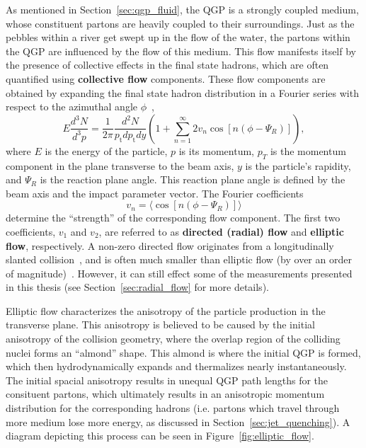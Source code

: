 As mentioned in Section~\ref{sec:qgp_fluid}, the QGP is a strongly coupled medium, whose constituent partons are heavily coupled to their surroundings. Just as the pebbles within a river get swept up in the flow of the water, the partons within the QGP are influenced by the flow of this medium. This flow manifests itself by the presence of collective effects in the final state hadrons, which are often quantified using \textbf{collective flow} components. These flow components are obtained by expanding the final state hadron distribution in a Fourier series with respect to the azimuthal angle $\phi$~\cite{Flow24},
%
\begin{equation}
    \label{eq:flow_fourier}
    E \frac{d^3 N}{d^3 p}=\frac{1}{2 \pi} \frac{d^2 N}{p_{\mathrm{t}} d p_{\mathrm{t}} d y}\left(1+\sum_{n=1}^{\infty} 2 v_n \cos \left[n\left(\phi-\Psi_R\right)\right]\right),
\end{equation}
where $E$ is the energy of the particle, $p$ is its momentum, $p_T$ is the momentum component in the plane transverse to the beam axis, $y$ is the particle's rapidity, and $\Psi_R$ is the reaction plane angle. This reaction plane angle is defined by the beam axis and the impact parameter vector. The Fourier coefficients
\begin{equation}
    v_n = \langle \cos[n(\phi - \Psi_R)] \rangle
\end{equation}
determine the ``strength'' of the corresponding flow component. The first two coefficients, $v_1$ and $v_2$, are referred to as \textbf{directed (radial) flow} and \textbf{elliptic flow}, respectively. A non-zero directed flow originates from a longitudinally slanted collision~\cite{DirectedFlow}, and is often much smaller than elliptic flow (by over an order of magnitude)~\cite{DirectedFlow2}. However, it can still effect some of the measurements presented in this thesis (see Section~\ref{sec:radial_flow} for more details).

Elliptic flow characterizes the anisotropy of the particle production in the transverse plane. This anisotropy is believed to be caused by the initial anisotropy of the collision geometry, where the overlap region of the colliding nuclei forms an ``almond'' shape. This almond is where the initial QGP is formed, which then hydrodynamically expands and thermalizes nearly instantaneously. The initial spacial anisotropy results in unequal QGP path lengths for the consituent partons, which ultimately results in an anisotropic momentum distribution for the corresponding hadrons (i.e. partons which travel through more medium lose more energy, as discussed in Section~\ref{sec:jet_quenching}). A diagram depicting this process can be seen in Figure~\ref{fig:elliptic_flow}.

